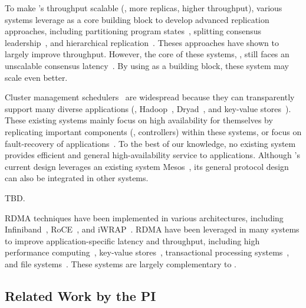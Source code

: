 To make \paxos's throughput scalable (\ie, more replicas, higher throughput), 
various systems leverage \paxos as a core building block to develop advanced 
replication approaches, including partitioning program 
states~\cite{scatter:sosp11,ssmr:dsn14}, splitting consensus 
leadership~\cite{mencius:osdi08,spaxos:srds12}, and hierarchical 
replication~\cite{manos:hotdep10,scatter:sosp11}. Theses approaches have shown 
to largely improve throughput. However, the core of these systems, 
\paxos, still faces an unscalable consensus 
latency~\cite{ellis:thesis,scatter:sosp11,manos:hotdep10}. By using \xxx as a 
building block, these system may scale even better.

 Cluster management 
schedulers~\cite{borg:eurosys15,mesos:nsdi11,tupperware,yarn:socc13,
autopilot:sosp07,quincy:sosp09,apollo:osdi14,fuxi:vldb14} are widespread 
because they can transparently support many diverse applications (\eg, 
Hadoop~\cite{hadoop}, Dryad~\cite{dryad}, and key-value stores~\cite{redis}). 
These existing systems mainly focus on high availability for themselves by 
replicating important components (\eg, controllers) within these systems, or 
focus on fault-recovery of applications~\cite{fuxi:vldb14}. To the best of our 
knowledge, no existing system provides efficient and general high-availability 
service to applications. Although \xxx's current design leverages an existing 
system Mesos~\cite{mesos:nsdi11}, its general \paxos protocol design can also 
be integrated in other systems.

 TBD.

 RDMA techniques have been implemented in various 
architectures, including Infiniband~\cite{infiniband}, RoCE~\cite{roce}, and 
iWRAP~\cite{iwrap}. RDMA have been leveraged in many systems to improve 
application-specific latency and throughput, including high performance 
computing~\cite{openmpi}, key-value 
stores~\cite{pilaf:usenix14,herd:sigcomm14,farm:nsdi14,memcached:rdma}, 
transactional processing systems~\cite{drtm:sosp15,farm:sosp15}, and file 
systems~\cite{gibson:nfs}. These systems are largely complementary to \xxx.

\vspace{-.15in}\subsection{Related Work by the PI} 
\label{sec:my-work}\vspace{-.075in}
% 

